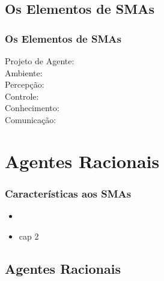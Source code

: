 \documentclass[10pt]{beamer}
\begin{document}

\subsection{Os Elementos de SMAs}



\begin{frame}[allowframebreaks=0.9]

    \frametitle{Os Elementos de SMAs}
   
   \begin{description}
     \item[Projeto de Agente:] 
     
    \item[Ambiente:]
          
   \item[Percepção:]
               
 \item[Controle:]
                    
  \item[Conhecimento:]
                          
  \item[Comunicação:]
          
   \end{description}
   
   
\end{frame}




\section{Agentes Racionais}
\begin{frame}

    \frametitle{Características aos SMAs}
    \begin{itemize}
    \pause
      \item 
\pause
      \item cap 2
    
    \end{itemize}
\end{frame}






\subsection{Agentes Racionais}
\end{document}
